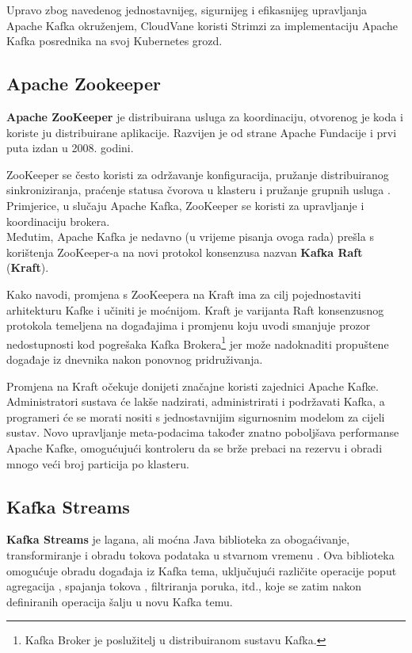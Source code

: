 \documentclass[times, utf8, diplomski]{fer}
\begin{document}
Upravo zbog navedenog jednostavnijeg, sigurnijeg i efikasnijeg upravljanja Apache Kafka okruženjem, CloudVane koristi Strimzi za implementaciju Apache Kafka posrednika na svoj Kubernetes grozd.

\subsection{Apache Zookeeper}

\textbf{Apache ZooKeeper} je distribuirana usluga za koordinaciju, otvorenog je koda i koriste ju distribuirane aplikacije. Razvijen je od strane Apache Fundacije i prvi puta izdan u 2008. godini.

ZooKeeper se često koristi za održavanje konfiguracija, pružanje distribuiranog sinkroniziranja, praćenje statusa čvorova u klasteru i pružanje grupnih usluga \citep{hunt_zookeeper_nodate}. Primjerice, u slučaju Apache Kafka, ZooKeeper se koristi za upravljanje i koordinaciju brokera.\\

Međutim, Apache Kafka je nedavno (u vrijeme pisanja ovoga rada) prešla s korištenja ZooKeeper-a na novi protokol konsenzusa nazvan \textbf{Kafka Raft} (\textbf{Kraft}).

Kako \citet{chandrakant_kafkas_2022} navodi, promjena s ZooKeepera na Kraft ima za cilj pojednostaviti arhitekturu Kafke i učiniti je moćnijom. Kraft je varijanta Raft konsenzusnog protokola temeljena na događajima i promjenu koju uvodi smanjuje prozor nedostupnosti kod pogrešaka Kafka Brokera\footnote{Kafka Broker je poslužitelj u distribuiranom sustavu Kafka.} jer može nadoknaditi propuštene događaje iz dnevnika nakon ponovnog pridruživanja. 

Promjena na Kraft očekuje donijeti značajne koristi zajednici Apache Kafke. Administratori sustava će lakše nadzirati, administrirati i podržavati Kafka, a programeri će se morati nositi s jednostavnijim sigurnosnim modelom za cijeli sustav. Novo upravljanje meta-podacima također znatno poboljšava performanse Apache Kafke, omogućujući kontroleru da se brže prebaci na rezervu i obradi mnogo veći broj particija po klasteru.

\clearpage
\subsection{Kafka Streams}
\label{sec:kstream}

\textbf{Kafka Streams} je lagana, ali moćna Java biblioteka za obogaćivanje, transformiranje i obradu tokova podataka u stvarnom vremenu \citep{seymour_mastering_2021}. Ova biblioteka omogućuje obradu događaja iz Kafka tema, uključujući različite operacije poput agregacija , spajanja tokova , filtriranja poruka, itd., koje se zatim nakon definiranih operacija šalju u novu Kafka temu.\\
\end{document}

